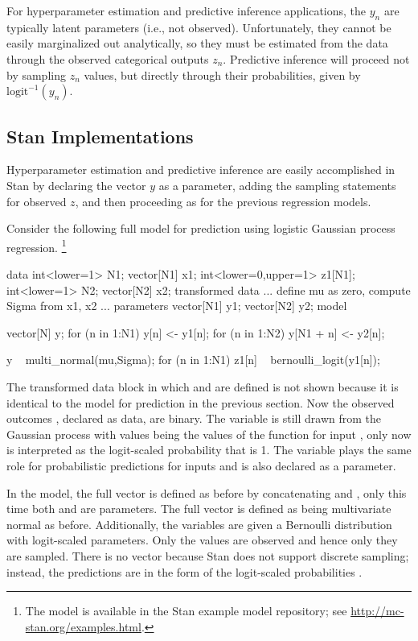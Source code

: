 For hyperparameter estimation and predictive inference applications,
the $y_n$ are typically latent parameters (i.e., not observed).
Unfortunately, they cannot be easily marginalized out analytically,
so they must be estimated from the data through the observed
categorical outputs $z_n$.  Predictive inference will proceed not by
sampling $z_n$ values, but directly through their probabilities, given
by $\mbox{logit}^{-1}(y_n)$.

\subsection{Stan Implementations}

Hyperparameter estimation and predictive inference are easily
accomplished in Stan by declaring the vector $y$ as a parameter,
adding the sampling statements for observed $z$, and then proceeding 
as for the previous regression models.  

Consider the following full model for prediction using logistic Gaussian
process regression.
%
\footnote{The model is available in the Stan example model repository;
see \url{http://mc-stan.org/examples.html}.}
%
\begin{stancode}
data {
  int<lower=1> N1;     
  vector[N1] x1; 
  int<lower=0,upper=1> z1[N1];
  int<lower=1> N2;
  vector[N2] x2;
}
transformed data {
 ... define mu as zero, compute Sigma from x1, x2 ...
}
parameters {
  vector[N1] y1;
  vector[N2] y2;
}
model {
  vector[N] y;
  for (n in 1:N1) y[n] <- y1[n];
  for (n in 1:N2) y[N1 + n] <- y2[n];

  y ~ multi_normal(mu,Sigma);
  for (n in 1:N1)
    z1[n] ~ bernoulli_logit(y1[n]);
}
\end{stancode}
%
The transformed data block in which  and  are
defined is not shown because it is identical to the model for
prediction in the previous section.  Now the observed outcomes
, declared as data, are binary.  The variable  is
still drawn from the Gaussian process with values  being
the values of the function for input , only now
 is interpreted as the logit-scaled probability that
 is 1.  The variable  plays the same role for
probabilistic predictions for inputs  and is also declared as
a parameter.

In the model, the full vector  is defined as before by
concatenating  and , only this time both 
and  are parameters.  The full vector  is defined as
being multivariate normal as before.  Additionally, the 
variables are given a Bernoulli distribution with logit-scaled
parameters.  Only the  values are observed and hence only
they are sampled.  There is no  vector because Stan does
not support discrete sampling; instead, the predictions are in the
form of the logit-scaled probabilities .

